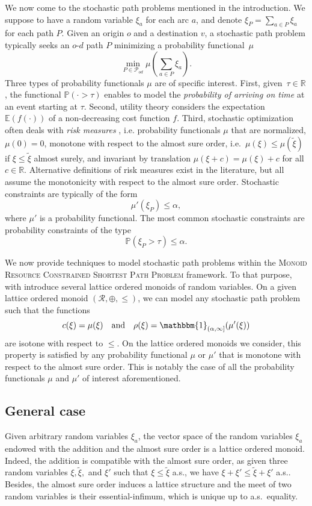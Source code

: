 \documentclass[11pt]{amsart}
\theoremstyle{plain}
\theoremstyle{remark}
\def\R{\mathbb{R}}
\def\P{\mathbb{P}}
\def\E{\mathbb{E}}
\newcommand{\ind}{\mathbbm{1}}
\newcommand{\MRCSP}{\textsc{Monoid Resource Constrained Shortest Path Problem}\xspace}
\newcommand{\rplus}{\oplus}
\newcommand{\rleq}{\leqslant}
\newcommand{\rset}{\mathcal{R}}
\newcommand{\rcost}{c}
\newcommand{\rmeas}{\rho}
\begin{document}
We now come to the stochastic path problems mentioned in the introduction. We suppose to have a random variable $\xi_{a}$ for each arc $a$, and denote $\xi_{P} = \sum_{a \in P}\xi_{a}$ for each path $P$. Given an origin $o$ and a destination $v$, a stochastic path problem typically seeks an $o$-$d$ path $P$ minimizing a probability functional~$\mu$
$$\min_{P\in \mathcal{P}_{od}} \mu\left(\sum_{a \in P}\xi_{a}\right).$$
Three types of probability functionals $\mu$ are of specific interest. First, given~$\tau \in \R$, the functional $\P(\cdot >\tau)$ enables to model the \emph{probability of arriving on time }at an event starting at $\tau$. Second, utility theory considers the expectation $\E(f(\cdot))$ of a non-decreasing cost function $f$. Third, stochastic optimization often deals with \emph{risk measures} \cite{artzner1999coherent}, i.e. probability functionals $\mu$ that are normalized, $\mu(0) = 0$, monotone with respect to the almost sure order, i.e.~$\mu(\xi) \leq \mu(\tilde{\xi})$ if $\xi\leq \tilde{\xi}$ almost surely, and invariant by translation $\mu(\xi+c) = \mu(\xi) + c$ for all $c\in \mathbb{R}$. Alternative definitions of risk measures exist in the literature, but all assume the monotonicity with respect to the almost sure order.  
Stochastic constraints are typically of the form
$$\mu'(\xi_{P}) \leq \alpha,$$
where $\mu'$ is a probability functional. The most common stochastic constraints are probability constraints of the type 
$$\P(\xi_{P} > \tau) \leq \alpha.$$

We now provide techniques to model stochastic path problems within the \MRCSP framework. To that purpose, with introduce several lattice ordered monoids of random variables. On a given lattice ordered monoid $(\rset,\rplus,\rleq)$, we can model any stochastic path problem such that the functions
$$\rcost(\xi) = \mu(\xi) \quad \text{and} \quad \rmeas(\xi) = \ind_{(\alpha,\infty]}(\mu'(\xi))$$ 
are isotone with respect to $\rleq$. On the lattice ordered monoids we consider, this property is satisfied by any probability functional $\mu$ or $\mu'$ that is monotone with respect to the almost sure order. This is notably the case of all the probability functionals $\mu$ and $\mu'$ of interest aforementioned.






\subsection{General case} \label{sub:general_case}
Given arbitrary random variables $\xi_{a}$, the vector space of the random variables $\xi_{a}$ endowed with the addition and the almost sure order is a lattice ordered monoid. Indeed, the addition is compatible with the almost sure order, as given three random variables $\xi,\tilde{\xi},$ and $\xi'$ such that $\xi \leq \tilde{\xi}$ a.s., we have $\xi + \xi' \leq \tilde{\xi} + \xi'$ a.s.. Besides, the almost sure order induces a lattice structure and the meet of two random variables is their essential-infimum, which is unique up to a.s.~equality.
\end{document}
